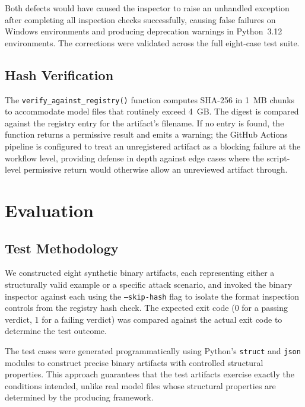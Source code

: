 \documentclass[preprint,12pt,twocolumn]{elsarticle}
\begin{document}
Both defects would have caused the inspector to raise an unhandled exception
after completing all inspection checks successfully, causing false failures
on Windows environments and producing deprecation warnings in Python~3.12
environments. The corrections were validated across the full eight-case
test suite.

\subsection{Hash Verification}

The \texttt{verify\_against\_registry()} function computes SHA-256 in
1~MB chunks to accommodate model files that routinely exceed 4~GB. The
digest is compared against the registry entry for the artifact's filename.
If no entry is found, the function returns a permissive result and emits
a warning; the GitHub Actions pipeline is configured to treat an
unregistered artifact as a blocking failure at the workflow level, providing
defense in depth against edge cases where the script-level permissive return
would otherwise allow an unreviewed artifact through.

\section{Evaluation}
\label{sec:eval}

\subsection{Test Methodology}

We constructed eight synthetic binary artifacts, each representing either
a structurally valid example or a specific attack scenario, and invoked
the binary inspector against each using the \texttt{--skip-hash} flag to
isolate the format inspection controls from the registry hash check. The
expected exit code (0 for a passing verdict, 1 for a failing verdict) was
compared against the actual exit code to determine the test outcome.

The test cases were generated programmatically using Python's \texttt{struct}
and \texttt{json} modules to construct precise binary artifacts with
controlled structural properties. This approach guarantees that the test
artifacts exercise exactly the conditions intended, unlike real model files
whose structural properties are determined by the producing framework.
\end{document}

